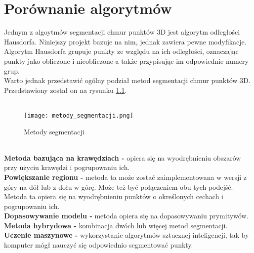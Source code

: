 	\chapter{Porównanie algorytmów}
	Jednym z algoytmów segmentacji chmur punktów 3D jest algorytm odległości Hausdorfa. Niniejszy projekt bazuje na nim, jednak zawiera pewne modyfikacje. Algorytm Hausdorfa grupuje punkty ze względu na ich odległości, oznaczając punkty jako obliczone i nieobliczone a także przypisując im odpowiednie numery grup.\cite{9286491}\\
	
	Warto jednak przedstawić ogólny podział metod segmentacji chmur punktów 3D. Przedstawiony został on na rysunku \ref{fig:segmethods}.\\%
	\\
	\begin{figure}[h!]
		\centering
		\texttt{[image: metody\_segmentacji.png]}
		\caption{Metody segmentacji}
		\label{fig:segmethods}
	\end{figure}
	\\%
	\textbf{Metoda bazująca na krawędziach - }opiera się na wyodrębnieniu obszarów przy użyciu krawędzi i pogrupowaniu ich.\\
	\textbf{Powiększanie regionu - }metoda ta może zostać zaimplementowana w wersji z góry na dół lub z dołu w górę. Może też być połączeniem obu tych podejść. Metoda ta opiera się na wyodrębnieniu punktów o określonych cechach i pogrupowaniu ich.\\
	\textbf{Dopasowywanie modelu - }metoda opiera się na dopasowywaniu prymitywów.\\
	\textbf{Metoda hybrydowa - }kombinacja dwóch lub więcej metod segmentacji.\\
	\textbf{Uczenie maszynowe - }wykorzystanie algorytmów sztucznej inteligencji, tak by komputer mógł nauczyć się odpowiednio segmentować punkty.\\
	